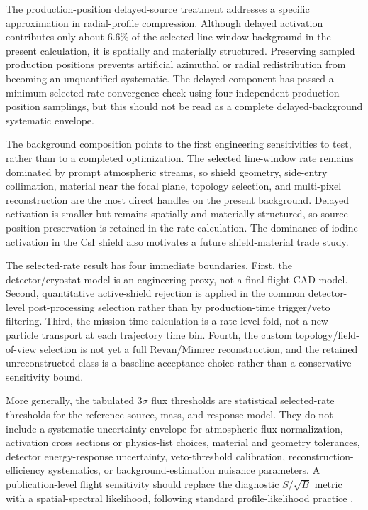 \documentclass[preprint,12pt]{elsarticle}
\begin{document}
The production-position delayed-source treatment addresses a specific approximation in radial-profile compression. Although delayed activation contributes only about 6.6\% of the selected line-window background in the present calculation, it is spatially and materially structured. Preserving sampled production positions prevents artificial azimuthal or radial redistribution from becoming an unquantified systematic. The delayed component has passed a minimum selected-rate convergence check using four independent production-position samplings, but this should not be read as a complete delayed-background systematic envelope.

The background composition points to the first engineering sensitivities to test, rather than to a completed optimization. The selected line-window rate remains dominated by prompt atmospheric streams, so shield geometry, side-entry collimation, material near the focal plane, topology selection, and multi-pixel reconstruction are the most direct handles on the present background. Delayed activation is smaller but remains spatially and materially structured, so source-position preservation is retained in the rate calculation. The dominance of iodine activation in the CsI shield also motivates a future shield-material trade study.

The selected-rate result has four immediate boundaries. First, the detector/cryostat model is an engineering proxy, not a final flight CAD model. Second, quantitative active-shield rejection is applied in the common detector-level post-processing selection rather than by production-time trigger/veto filtering. Third, the mission-time calculation is a rate-level fold, not a new particle transport at each trajectory time bin. Fourth, the custom topology/field-of-view selection is not yet a full Revan/Mimrec reconstruction, and the retained unreconstructed class is a baseline acceptance choice rather than a conservative sensitivity bound.

More generally, the tabulated $3\sigma$ flux thresholds are statistical selected-rate thresholds for the reference source, mass, and response model. They do not include a systematic-uncertainty envelope for atmospheric-flux normalization, activation cross sections or physics-list choices, material and geometry tolerances, detector energy-response uncertainty, veto-threshold calibration, reconstruction-efficiency systematics, or background-estimation nuisance parameters. A publication-level flight sensitivity should replace the diagnostic $S/\sqrt{B}$ metric with a spatial-spectral likelihood, following standard profile-likelihood practice \cite{Cowan2011}.
\end{document}
